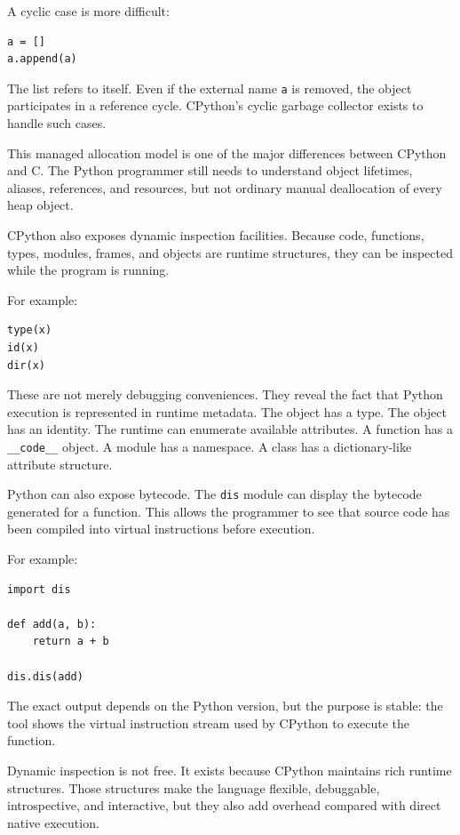 A cyclic case is more difficult:

\begin{verbatim}
a = []
a.append(a)
\end{verbatim}

The list refers to itself. Even if the external name \texttt{a} is removed, the object participates in a reference cycle. CPython's cyclic garbage collector exists to handle such cases.

This managed allocation model is one of the major differences between CPython and C. The Python programmer still needs to understand object lifetimes, aliases, references, and resources, but not ordinary manual deallocation of every heap object.

CPython also exposes dynamic inspection facilities. Because code, functions, types, modules, frames, and objects are runtime structures, they can be inspected while the program is running.

For example:

\begin{verbatim}
type(x)
id(x)
dir(x)
\end{verbatim}

These are not merely debugging conveniences. They reveal the fact that Python execution is represented in runtime metadata. The object has a type. The object has an identity. The runtime can enumerate available attributes. A function has a \texttt{\_\_code\_\_} object. A module has a namespace. A class has a dictionary-like attribute structure.

Python can also expose bytecode. The \texttt{dis} module can display the bytecode generated for a function. This allows the programmer to see that source code has been compiled into virtual instructions before execution.

For example:

\begin{verbatim}
import dis

def add(a, b):
    return a + b

dis.dis(add)
\end{verbatim}

The exact output depends on the Python version, but the purpose is stable: the tool shows the virtual instruction stream used by CPython to execute the function.

Dynamic inspection is not free. It exists because CPython maintains rich runtime structures. Those structures make the language flexible, debuggable, introspective, and interactive, but they also add overhead compared with direct native execution.

